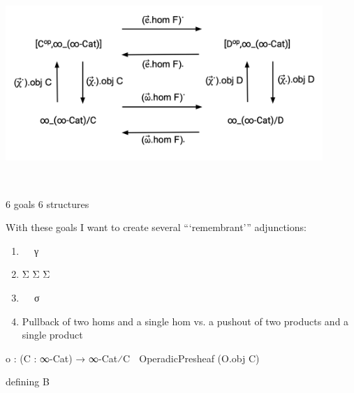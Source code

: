 \documentclass{book}
\theoremstyle{definition}
\begin{document}
\begin{center}
\includegraphics[width=0.9\textwidth]{ND10.png} \\
\end{center}

\ \\

\newpage


6 goals
6 structures

With these goals I want to create several ```remembrant''' adjunctions:

\begin{enumerate}
\item γ⃗ γ⃡ γ
\item Σ⃗ Σ⃡ Σ
\item σ⃗ σ⃡ σ
\item Pullback of two homs and a single hom vs. a pushout of two products and a single product
\end{enumerate}



\begin{center}
o⃗ : (C : ∞-Cat) → ∞-Cat⁄C ⭢ OperadicPresheaf (O⃗.obj C)
\end{center}

defining B
\end{document}
